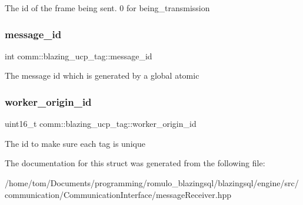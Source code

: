 The id of the frame being sent. 0 for being\+\_\+transmission \mbox{\label{structcomm_1_1blazing__ucp__tag_a31f59e8f5c2a690df88ca3a4147ef942}} 
\subsubsection{\texorpdfstring{message\+\_\+id}{message\_id}}
{\footnotesize\ttfamily int comm\+::blazing\+\_\+ucp\+\_\+tag\+::message\+\_\+id}

The message id which is generated by a global atomic \mbox{\label{structcomm_1_1blazing__ucp__tag_ae34c2b757572ae3316c4c52b220e368b}} 
\subsubsection{\texorpdfstring{worker\+\_\+origin\+\_\+id}{worker\_origin\_id}}
{\footnotesize\ttfamily uint16\+\_\+t comm\+::blazing\+\_\+ucp\+\_\+tag\+::worker\+\_\+origin\+\_\+id}

The id to make sure each tag is unique 

The documentation for this struct was generated from the following file\+:\begin{DoxyCompactItemize}
\item 
/home/tom/\+Documents/programming/romulo\+\_\+blazingsql/blazingsql/engine/src/communication/\+Communication\+Interface/message\+Receiver.\+hpp\end{DoxyCompactItemize}
